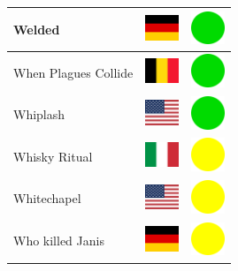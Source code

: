 \documentclass[12pt, a4paper, twoside]{report}
\begin{document}
\begin{center}
\begin{longtable}{|p{5cm}|p{2cm}|p{2cm}|}
 Welded                                                     & \includegraphics[width=1cm]{../img/flags/de} &   \includegraphics[width=1cm]{../likes/y} \\ \hline
 When Plagues Collide                                       & \includegraphics[width=1cm]{../img/flags/be} &   \includegraphics[width=1cm]{../likes/y} \\ \hline
 Whiplash                                                   & \includegraphics[width=1cm]{../img/flags/us} &   \includegraphics[width=1cm]{../likes/y} \\ \hline
 Whisky Ritual                                              & \includegraphics[width=1cm]{../img/flags/it} &   \includegraphics[width=1cm]{../likes/m} \\ \hline
 Whitechapel                                                & \includegraphics[width=1cm]{../img/flags/us} &   \includegraphics[width=1cm]{../likes/m} \\ \hline
 Who killed Janis                                           & \includegraphics[width=1cm]{../img/flags/de} &   \includegraphics[width=1cm]{../likes/m} \\ \hline

\end{longtable}
\end{center}
\end{document}
